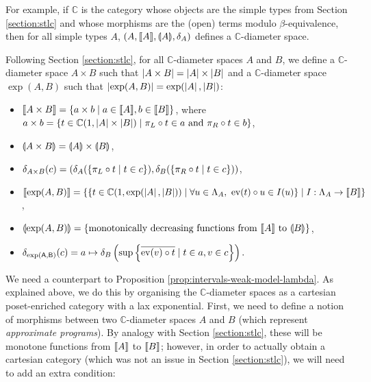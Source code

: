 For example, if $\mathbb{C}$ is the category whose objects are the simple types from Section \ref{section:stlc} and whose morphisms are the (open) terms modulo $\beta$-equivalence, then for all simple types $A$, $(A, \llbracket A \rrbracket, \llparenthesis A \rrparenthesis, \delta_A)$ defines a $\mathbb{C}$-diameter space.

Following Section \ref{section:stlc}, for all $\mathbb{C}$-diameter spaces $A$ and $B$, we define a $\mathbb{C}$-diameter space $A \times B$ such that $\left\vert A \times B\right\vert = \left\vert A\right\vert \times \left\vert B\right\vert$ and a $\mathbb{C}$-diameter space $\exp(A,B)$ such that $\left\vert\exp(A,B)\right\vert = \exp(\left\vert A\right\vert,\left\vert B\right\vert)$: \begin{itemize}
\item $\llbracket A \times B \rrbracket = \{ a \times b \mid a \in \llbracket A \rrbracket, b \in \llbracket B \rrbracket \} $, where $a \times b = \{ t \in \mathbb{C}(1, \left\vert A\right\vert \times \left\vert B\right\vert) \mid \pi_L \circ t \in a \text{ and } \pi_R \circ t \in b \}$,
\item $\llparenthesis A \times B \rrparenthesis = \llparenthesis A \rrparenthesis \times \llparenthesis B \rrparenthesis$,
\item $\delta_{A \times B}(c) = (\delta_A(\{ \pi_L \circ t \mid t \in c \}), \delta_B(\{ \pi_R \circ t \mid t \in c \}))$,
\item $\llbracket \exp(A, B) \rrbracket = \{ \{ t \in \mathbb{C}(1, \exp(\left\vert A\right\vert, \left\vert B\right\vert)) \mid \forall u \in \Lambda_{A},~ \operatorname{ev}(t) \circ u \in I(u) \} \mid I : \Lambda_A \to \llbracket B \rrbracket \}$,
\item $\llparenthesis \exp(A, B) \rrparenthesis = \{ \text{monotonically decreasing functions from } \llbracket A \rrbracket \text{ to } \llparenthesis B \rrparenthesis \}$,
\item $\delta_\mathsf{\exp(A, B)}(c) = a \mapsto \delta_B\left(\sup\left\{\overline{\operatorname{ev}(v) \circ t} \mid t\in a, v \in c\right\}\right).$
\end{itemize}

We need a counterpart to Proposition \ref{prop:intervals-weak-model-lambda}. As explained above, we do this by organising the $\mathbb{C}$-diameter spaces as a cartesian poset-enriched category with a lax exponential. First, we need to define a notion of morphisms between two $\mathbb{C}$-diameter spaces $A$ and $B$ (which represent \emph{approximate programs}). By analogy with Section \ref{section:stlc}, these will be monotone functions from $\llbracket A \rrbracket$ to $\llbracket B \rrbracket$; however, in order to actually obtain a cartesian category (which was not an issue in Section \ref{section:stlc}), we will need to add an extra condition:

